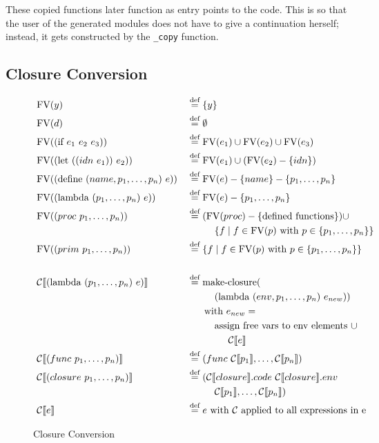 \documentclass[11pt]{report}
\newcommand{\eqdef}{\stackrel{\text{def}}{=}}%
\begin{document}
These copied functions later function as entry points to the code. This is so that the user of the generated modules does not have to give a continuation herself; instead, it gets constructed by the \texttt{_copy} function.

\subsection{Closure Conversion}
\begin{figure}[p]
\begin{alignat*}{2}
&\text{FV}(y) &&\eqdef \{y\}\\
&\text{FV}(d) &&\eqdef \emptyset\\
&\text{FV}((\text{if}\ e_1\ e_2\ e_3)) &&\eqdef \text{FV}(e_1) \cup \text{FV}(e_2) \cup \text{FV}(e_3)\\
&\text{FV}((\text{let}\ ((idn\ e_1))\ e_2)) &&\eqdef \text{FV}(e_1) \cup (\text{FV}(e_2) - \{idn\})\\
&\text{FV}((\text{define}\ (name, p_1, \dots, p_n)\ e)) &&\eqdef \text{FV}(e) - \{name\} - \{p_1, \dots, p_n\}\\
&\text{FV}((\text{lambda}\ (p_1, \dots, p_n)\ e)) &&\eqdef \text{FV}(e) - \{p_1, \dots, p_n\}\\
&\text{FV}((proc\ p_1, \dots, p_n)) &&\eqdef (\text{FV}(proc) - \{\text{defined functions}\}) \cup \\
&&&\hspace{1cm}\{f \mid f \in \text{FV}(p)\ \text{with}\ p \in \{p_1, \dots, p_n\}\}\\
&\text{FV}((prim\ p_1, \dots, p_n)) &&\eqdef \{f \mid f \in \text{FV}(p)\ \text{with}\ p \in \{p_1, \dots, p_n\}\}\\
%
&&&\\
%
&\mathcal{C}\llbracket (\text{lambda}\ (p_1, \dots, p_n)\ e) \rrbracket &&\eqdef \text{make-closure}(\\
&&&\hspace{1cm}(\text{lambda}\ (env, p_1, \dots, p_n)\ e_{new}))\\
&&&\hspace{0.625cm}\text{with}\ e_{new} = \\
&&&\hspace{1cm}\text{assign free vars to env elements}\ \cup \\
&&&\hspace{1.5cm}\mathcal{C}\llbracket e \rrbracket\\
%
&\mathcal{C}\llbracket (func\ p_1, \dots, p_n) \rrbracket &&\eqdef (func\  \mathcal{C}\llbracket p_1 \rrbracket, \dots, \mathcal{C}\llbracket p_n \rrbracket)\\
&\mathcal{C}\llbracket (closure\ p_1, \dots, p_n) \rrbracket &&\eqdef (\mathcal{C}\llbracket closure\rrbracket.code\ \mathcal{C}\llbracket closure\rrbracket.env\\\
&&&\hspace{1cm}\mathcal{C}\llbracket p_1\rrbracket, \dots, \mathcal{C}\llbracket p_n\rrbracket)\\
&\mathcal{C}\llbracket e \rrbracket && \eqdef e\text{ with $\mathcal{C}$ applied to all expressions in e}
\end{alignat*}
\caption{Closure Conversion}
\label{cloconv}
\end{figure}
\end{document}
